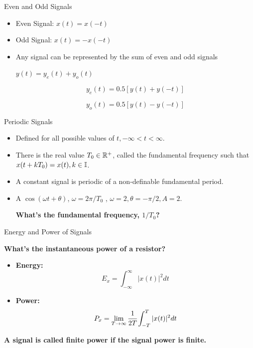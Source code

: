 \documentclass[aspectratio=169,xcolor=dvipsnames,svgnames,x11names,fleqn]{beamer}
\begin{document}
\begin{frame}{Even and Odd Signals}
\begin{itemize}
    \item Even Signal: $x(t) = x(-t)$
\item Odd Signal:
$x(t) = -x(-t)$
\item Any signal can be represented by the sum of even and odd signals

$y(t) = y_e(t) + y_o(t)$

$$
y_e(t) = 0.5[ y(t)  + y(-t) ]$$

$$
y_o(t) = 0.5[y(t) - y(-t) ]
$$

\end{itemize}
\end{frame}

\begin{frame}{Periodic Signals}


\begin{itemize}
    \item Defined for all possible values of $t, -\infty < t < \infty$.
    \item 
There is the real value $T_0 \in {\mathbb R}^+$, called the fundamental frequency such that $x(  t + kT_0 ) = x(t), k \in {\mathbb I}$.

\item A constant signal is periodic of a non-definable fundamental period.
\item A $\cos(\omega t + \theta)$, $\omega = 2\pi/T_0$ ,
$\omega = 2, \theta = -\pi/2, A= 2$.

\vspace{5pt}

\bf \color{red}
What’s the fundamental frequency, $1/T_0$?
\end{itemize}
\end{frame}

\begin{frame}{Energy and Power of Signals}

{
\bf\color{red}What's the instantaneous power of a resistor?
}

    \begin{itemize}
        \item \textbf{Energy:}
        $$
        E_x = \int_{-\infty}^\infty | x(t)| ^2 dt
        $$

        \item \textbf{Power:}
        $$
        P_x = \lim_{T\to\infty}\cfrac{1}{2T} \int_{-T}^T | x(t)| ^2 dt
        $$
    \end{itemize}

    \bf A signal is called finite power if the signal power is finite.
\end{frame}
\end{document}

